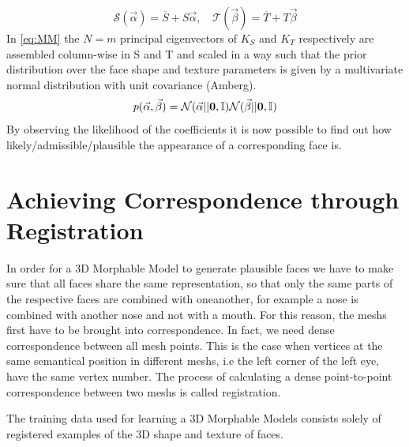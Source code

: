 \begin{equation}
\label{eq:MM}
\mathcal{S}(\vec\alpha)=\overline{S}+S\vec\alpha, \quad \mathcal{T}(\vec\beta)=\overline{T}+T\vec\beta
\end{equation}
In \eqref{eq:MM} the $N=m$ principal eigenvectors of $K_{S}$ and $K_{T}$ respectively are assembled column-wise in S and T and scaled in a way such that the prior distribution over the face shape and texture parameters is given by a multivariate normal distribution with unit covariance (Amberg).
\begin{equation}
    p(\vec\alpha, \vec\beta) = \mathcal{N}(\vec\alpha\vert|\textbf{0}, \mathbb{I})\mathcal{N}(\vec\beta\vert|\textbf{0}, \mathbb{I})
\end{equation}
By observing the likelihood of the coefficients it is now possible to find out how likely/admissible/plausible the appearance of a corresponding face is.

\section{Achieving Correspondence through Registration}
In order for a 3D Morphable Model to generate plausible faces we have to make sure that all faces share the same representation, so that only the same parts of the respective faces are combined with oneanother, for example a nose is combined with another nose and not with a mouth. For this reason, the meshs first have to be brought into correspondence. In fact, we need dense correspondence between all mesh points. This is the case when vertices at the same semantical position in
different meshs, i.e the left corner of the left eye, have the same vertex number. The process of calculating a dense point-to-point correspondence between two meshs is called registration.  

The training data used for learning a 3D Morphable Models consists solely of registered examples of the 3D shape and texture of faces.

